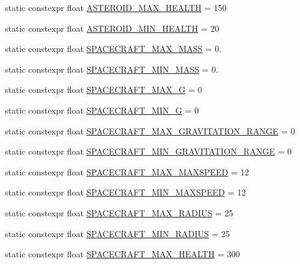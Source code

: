 \begin{DoxyCompactItemize}
\item 
static constexpr float \hyperlink{class_act_conf_a170217526941bb625a01f12edb8874d9}{A\+S\+T\+E\+R\+O\+I\+D\+\_\+\+M\+A\+X\+\_\+\+H\+E\+A\+L\+T\+H} = 150
\item 
static constexpr float \hyperlink{class_act_conf_aced9507730ae6294fc4c5f62071a55bc}{A\+S\+T\+E\+R\+O\+I\+D\+\_\+\+M\+I\+N\+\_\+\+H\+E\+A\+L\+T\+H} = 20
\item 
static constexpr float \hyperlink{class_act_conf_ae0b107a0811e1f4d4572ae632665ce1f}{S\+P\+A\+C\+E\+C\+R\+A\+F\+T\+\_\+\+M\+A\+X\+\_\+\+M\+A\+S\+S} = 0.
\item 
static constexpr float \hyperlink{class_act_conf_a77e8767d906b9ea45ca0b2d5ed4c8f09}{S\+P\+A\+C\+E\+C\+R\+A\+F\+T\+\_\+\+M\+I\+N\+\_\+\+M\+A\+S\+S} = 0.
\item 
static constexpr float \hyperlink{class_act_conf_a8f3fbf0b7b3a24956d4d15a8624407ac}{S\+P\+A\+C\+E\+C\+R\+A\+F\+T\+\_\+\+M\+A\+X\+\_\+\+G} = 0
\item 
static constexpr float \hyperlink{class_act_conf_ac6c2f4e41a3b6428018008245052c051}{S\+P\+A\+C\+E\+C\+R\+A\+F\+T\+\_\+\+M\+I\+N\+\_\+\+G} = 0
\item 
static constexpr float \hyperlink{class_act_conf_a1fd237bf2f15c4677ad43f28835fc615}{S\+P\+A\+C\+E\+C\+R\+A\+F\+T\+\_\+\+M\+A\+X\+\_\+\+G\+R\+A\+V\+I\+T\+A\+T\+I\+O\+N\+\_\+\+R\+A\+N\+G\+E} = 0
\item 
static constexpr float \hyperlink{class_act_conf_a3fce837a9f6a00b8f6c62de1521af1f2}{S\+P\+A\+C\+E\+C\+R\+A\+F\+T\+\_\+\+M\+I\+N\+\_\+\+G\+R\+A\+V\+I\+T\+A\+T\+I\+O\+N\+\_\+\+R\+A\+N\+G\+E} = 0
\item 
static constexpr float \hyperlink{class_act_conf_a344c01162d9dc7a6dee644632a8b5e7d}{S\+P\+A\+C\+E\+C\+R\+A\+F\+T\+\_\+\+M\+A\+X\+\_\+\+M\+A\+X\+S\+P\+E\+E\+D} = 12
\item 
static constexpr float \hyperlink{class_act_conf_adc638c73661b29919fe38e8eefaa7672}{S\+P\+A\+C\+E\+C\+R\+A\+F\+T\+\_\+\+M\+I\+N\+\_\+\+M\+A\+X\+S\+P\+E\+E\+D} = 12
\item 
static constexpr float \hyperlink{class_act_conf_a5a4e012b5cb0b7cbd398127d1ffd323d}{S\+P\+A\+C\+E\+C\+R\+A\+F\+T\+\_\+\+M\+A\+X\+\_\+\+R\+A\+D\+I\+U\+S} = 25
\item 
static constexpr float \hyperlink{class_act_conf_ae9b2cc567269955c8b2e54394d23f013}{S\+P\+A\+C\+E\+C\+R\+A\+F\+T\+\_\+\+M\+I\+N\+\_\+\+R\+A\+D\+I\+U\+S} = 25
\item 
static constexpr float \hyperlink{class_act_conf_a4623d00aa2c1dc6b2292d73adf5e7a11}{S\+P\+A\+C\+E\+C\+R\+A\+F\+T\+\_\+\+M\+A\+X\+\_\+\+H\+E\+A\+L\+T\+H} = 300

\end{DoxyCompactItemize}
